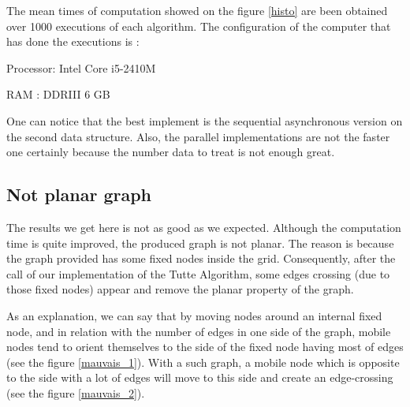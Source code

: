 The mean times of computation showed on the figure \ref{histo} are been
obtained over 1000 executions of each algorithm. The configuration of the
computer that has done the executions is :
\begin{description}
\item {Processor}: Intel Core i5-2410M
\item {RAM} : DDRIII 6 GB
\end{description}

One can notice that the best implement is the sequential asynchronous
version on the second data structure. Also, the parallel implementations
are not the faster one certainly because the number data to treat is not
enough great.

\subsection{Not planar graph}
The results we get here is not as good as we expected. Although the
computation time is quite improved, the produced graph is not planar.  The
reason is because the graph provided has some fixed nodes inside the
grid. Consequently, after the call of our implementation of the Tutte
Algorithm, some edges crossing (due to those fixed nodes) appear and remove
the planar property of the graph.

As an explanation, we can say that by moving nodes around an internal fixed
node, and in relation with the number of edges in one side of the graph, mobile
nodes tend to orient themselves to the side of the fixed node having
most of edges (see the figure \ref{mauvais_1}). With a such graph, a
mobile node which is opposite to the side with a lot of edges will move to
this side and create an edge-crossing (see the figure \ref{mauvais_2}).

